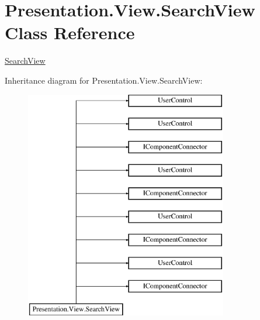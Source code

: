 \hypertarget{class_presentation_1_1_view_1_1_search_view}{}\section{Presentation.\+View.\+Search\+View Class Reference}
\label{class_presentation_1_1_view_1_1_search_view}


\hyperlink{class_presentation_1_1_view_1_1_search_view}{Search\+View}  


Inheritance diagram for Presentation.\+View.\+Search\+View\+:\begin{figure}[H]
\begin{center}
\leavevmode
\includegraphics[height=10.000000cm]{class_presentation_1_1_view_1_1_search_view}
\end{center}
\end{figure}
